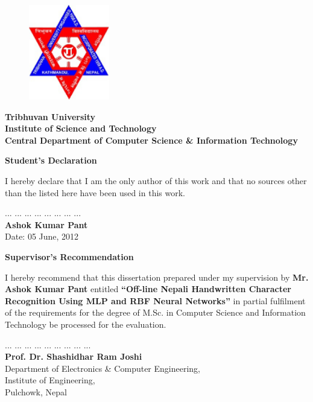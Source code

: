 \pagebreak
\pagestyle{empty}
\begin{figure}[tp] %
\centering
\includegraphics[width=100pt]{title_pages/logo.eps}
\end{figure}
\begin{center}
    \Large\textbf{{Tribhuvan University\\
    Institute of Science and Technology\\
    \large Central Department of Computer Science \& Information Technology}}   					%


 {\vspace*{8mm} \textbf{{Student’s Declaration }}}\par										%
 \end{center}
\vspace*{4mm}I hereby declare that I am the only author of this work and that no sources other than the
 listed here have been used in this work.


{\vspace*{8mm} {... ... ... ... ... ... ... ...}}\\
\textbf{Ashok Kumar Pant}\\																%
Date: 05 June, 2012\\																%

\begin{center}
{\Large\vspace*{8mm}\textbf{Supervisor's Recommendation  }}\par							%
\end{center}
\vspace*{4mm}I hereby recommend that this dissertation prepared under my supervision by \textbf{Mr. Ashok Kumar Pant} entitled \textbf{“Off-line Nepali Handwritten Character Recognition Using MLP and RBF Neural Networks”} in partial fulfilment of the requirements for the degree of M.Sc. in Computer Science and Information Technology be processed for the evaluation.\par


{\vspace*{8mm} {... ... ... ... ... ... ... ... ...}}\\
\textbf{Prof. Dr. Shashidhar Ram Joshi}\\ 	        %
Department of Electronics \& Computer Engineering,\\
Institute of Engineering,\\
Pulchowk, Nepal\\								
\\										%


